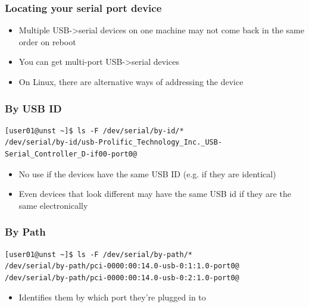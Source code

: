 \documentclass[aspectratio=1610,9pt]{beamer} %
\begin{document}
\begin{frame}[fragile]
\frametitle{Locating your serial port device}

\begin{itemize}
\itemsep1pt\parskip0pt
\item
  Multiple USB-\textgreater{}serial devices on one machine may not come
  back in the same order on reboot
\item
  You can get multi-port USB-\textgreater{}serial devices
\item
  On Linux, there are alternative ways of addressing the device
\end{itemize}

\subsubsection{By USB ID}

\begin{verbatim}
[user01@unst ~]$ ls -F /dev/serial/by-id/*
/dev/serial/by-id/usb-Prolific_Technology_Inc._USB-Serial_Controller_D-if00-port0@
\end{verbatim}

\begin{itemize}
\itemsep1pt\parskip0pt
\item
  No use if the devices have the same USB ID (e.g. if they are
  identical)
\item
  Even devices that look different may have the same USB id if they are
  the same electronically
\end{itemize}

\subsubsection{By Path}

\begin{verbatim}
[user01@unst ~]$ ls -F /dev/serial/by-path/*
/dev/serial/by-path/pci-0000:00:14.0-usb-0:1:1.0-port0@
/dev/serial/by-path/pci-0000:00:14.0-usb-0:2:1.0-port0@
\end{verbatim}

\begin{itemize}
\itemsep1pt\parskip0pt
\item
  Identifies them by which port they're plugged in to
\end{itemize}

\end{frame}
\end{document}
